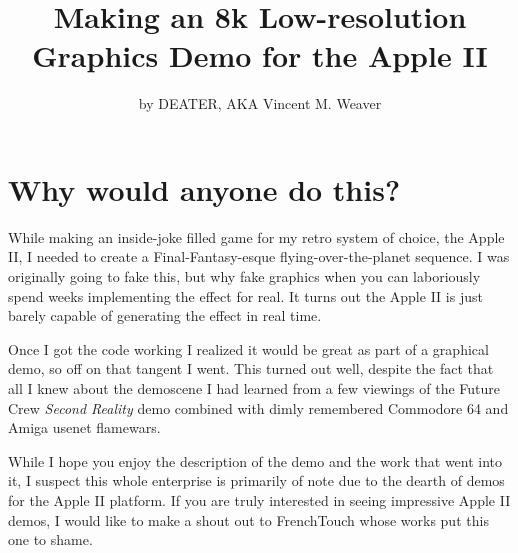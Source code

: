 \documentclass[twocolumn]{article}
\begin{document}
\title{Making an 8k Low-resolution Graphics Demo for the Apple II}
\author{by DEATER, AKA Vincent M. Weaver}
\date{}
\maketitle

\section{Why would anyone do this?}

While making an inside-joke filled game for my retro system of choice,
the Apple II, I needed to create a Final-Fantasy-esque
flying-over-the-planet sequence.
I was originally going to fake this, but why fake graphics when you
can laboriously spend weeks implementing the effect for real.
It turns out the Apple II is just barely capable of generating
the effect in real time.

Once I got the code working I realized it would be great as part of a
graphical demo, so off on that tangent I went.
This turned out well, despite the fact that all I knew about the demoscene I
had learned from a few viewings of the Future Crew {\em Second Reality} demo
combined with dimly remembered Commodore 64 and Amiga usenet flamewars.



While I hope you enjoy the description of the demo and the work that
went into it, I suspect this whole enterprise is primarily of note
due to the dearth of demos for the Apple II platform.
If you are truly interested in seeing impressive Apple II demos, 
I would like to make a shout out to FrenchTouch whose works
put this one to shame.


\end{document}
